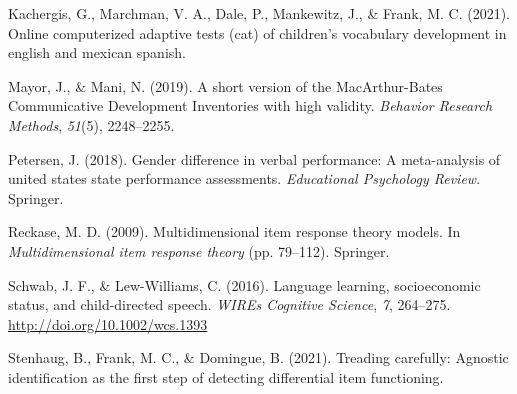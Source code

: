 \documentclass[10pt, letterpaper]{article}
\begin{document}
\leavevmode\hypertarget{ref-kachergis2021cat}{}%
Kachergis, G., Marchman, V. A., Dale, P., Mankewitz, J., \& Frank, M. C.
(2021). Online computerized adaptive tests (cat) of children's
vocabulary development in english and mexican spanish.

\leavevmode\hypertarget{ref-mayor2019}{}%
Mayor, J., \& Mani, N. (2019). A short version of the MacArthur-Bates
Communicative Development Inventories with high validity. \emph{Behavior
Research Methods}, \emph{51}(5), 2248--2255.

\leavevmode\hypertarget{ref-petersen2018gender}{}%
Petersen, J. (2018). Gender difference in verbal performance: A
meta-analysis of united states state performance assessments.
\emph{Educational Psychology Review}. Springer.

\leavevmode\hypertarget{ref-reckase2009}{}%
Reckase, M. D. (2009). Multidimensional item response theory models. In
\emph{Multidimensional item response theory} (pp. 79--112). Springer.

\leavevmode\hypertarget{ref-schwab2016}{}%
Schwab, J. F., \& Lew-Williams, C. (2016). Language learning,
socioeconomic status, and child-directed speech. \emph{WIREs Cognitive
Science}, \emph{7}, 264--275. \url{http://doi.org/10.1002/wcs.1393}

\leavevmode\hypertarget{ref-stenhaug2021treading}{}%
Stenhaug, B., Frank, M. C., \& Domingue, B. (2021). Treading carefully:
Agnostic identification as the first step of detecting differential item
functioning.


\end{document}

